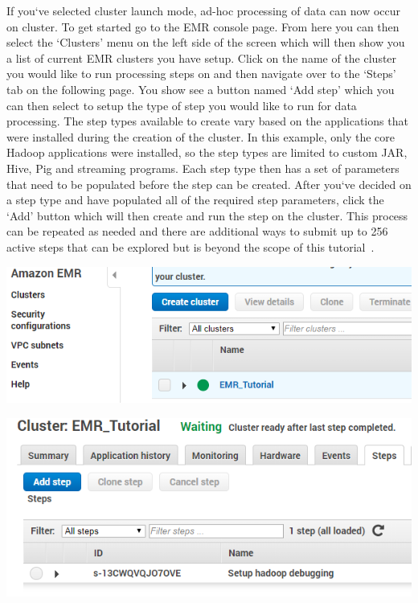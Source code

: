 If you`ve selected cluster launch mode, ad-hoc processing of data can now 
occur on cluster. To get started go to the EMR console page. From here you can 
then select the `Clusters' menu on the left side of the screen which will 
then show you a list of current EMR clusters you have setup. Click on the 
name of the cluster you would like to run processing steps on and then navigate 
over to the `Steps' tab on the following page. You show see a button named 
`Add step' which you can then select to setup the type of step you would like to 
run for data processing. The step types available to create vary based on the 
applications that were installed during the creation of the cluster. In this 
example, only the core Hadoop applications were installed, so the step types 
are limited to custom JAR, Hive, Pig and streaming programs. Each step type 
then has a set of parameters that need to be populated before the step can be 
created. After you`ve decided on a step type and have populated all of the 
required step parameters, click the `Add' button which will then create and 
run the step on the cluster. This process can be repeated as needed and there 
are additional ways to submit up to 256 active steps that can be explored but 
is beyond the scope of this tutorial~\cite{hid-sp18-521-emrprocess}.  

\centering\includegraphics[width=\columnwidth]{../images/emr_cluster_create.png}

\centering\includegraphics[width=\columnwidth]{../images/emr_cluster_steps.png}

